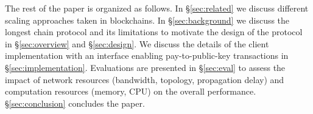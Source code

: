 
The rest of the paper is organized as follows. In \S\ref{sec:related} we discuss different scaling approaches taken in blockchains. In \S\ref{sec:background} we discuss the longest chain protocol and its limitations to motivate the design of the \prism protocol in \S\ref{sec:overview} and \S\ref{sec:design}. We discuss the details of the client implementation with an interface enabling pay-to-public-key transactions in \S\ref{sec:implementation}. Evaluations are presented in \S\ref{sec:eval} to assess the impact of network resources (bandwidth, topology, propagation delay) and computation resources (memory, CPU) on the overall performance. \S\ref{sec:conclusion} concludes the paper.








